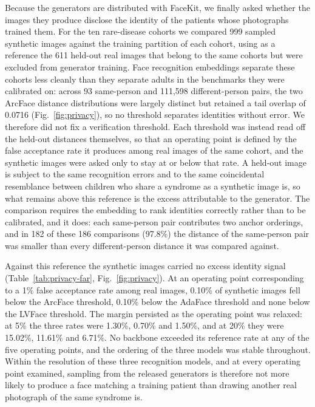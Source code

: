 \documentclass[11pt]{article}
\begin{document}
Because the generators are distributed with FaceKit, we finally asked whether
the images they produce disclose the identity of the patients whose photographs
trained them. For the ten rare-disease cohorts we compared 999 sampled synthetic
images against the training partition of each cohort, using as a reference the
611 held-out real images that belong to the same cohorts but were excluded from
generator training. Face recognition embeddings separate these cohorts less
cleanly than they separate adults in the benchmarks they were calibrated on:
across 93 same-person and 111,598 different-person pairs, the two ArcFace
distance distributions were largely distinct but retained a tail overlap of
0.0716 (Fig.~\ref{fig:privacy}), so no threshold
separates identities without error. We therefore did not fix a verification
threshold. Each threshold was instead read off the held-out distances
themselves, so that an operating point is defined by the false acceptance rate
it produces among real images of the same cohort, and the synthetic images were
asked only to stay at or below that rate. A held-out image is subject to the
same recognition errors and to the same coincidental resemblance between
children who share a syndrome as a synthetic image is, so what remains above
this reference is the excess attributable to the generator. The comparison
requires the embedding to rank identities correctly rather than to be
calibrated, and it does: each same-person pair contributes two anchor orderings,
and in 182 of these 186 comparisons (97.8\%) the distance of the same-person
pair was smaller than every different-person distance it was compared against.



Against this reference the synthetic images carried no excess identity signal
(Table~\ref{tab:privacy-far},
Fig.~\ref{fig:privacy}). At an operating point
corresponding to a 1\% false acceptance rate among real images, 0.10\% of
synthetic images fell below the ArcFace threshold, 0.10\% below the AdaFace
threshold and none below the LVFace threshold. The margin persisted as the
operating point was relaxed: at 5\% the three rates were 1.30\%, 0.70\% and
1.50\%, and at 20\% they were 15.02\%, 11.61\% and 6.71\%. No backbone exceeded
its reference rate at any of the five operating points, and the ordering of the
three models was stable throughout. Within the resolution of these three
recognition models, and at every operating point examined, sampling from the
released generators is therefore not more likely to produce a face matching a
training patient than drawing another real photograph of the same syndrome is.
\end{document}
